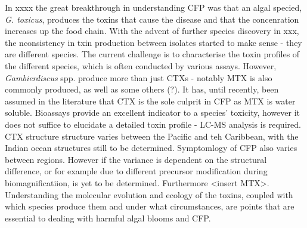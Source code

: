 \documentclass[12pt]{article}
\begin{document}
In xxxx the great breakthrough in understanding CFP was that an algal specied, \emph{G.  toxicus}, produces the toxins that cause the disease and that the concenration increases up the food chain. With the advent of further species discovery in xxx, the nconsistency in txin production between isolates started to make sense - they are different species. The current challenge is to characterise the toxin profiles of the different species, which is often conducted by various assays. However, \emph{Gambierdiscus} spp. produce more than just CTXs - notably MTX is also commonly produced, as well as some others (?). It has, until recently, been assumed in the literature that CTX is the sole culprit in CFP as MTX is water soluble. Bioassays provide an excellent indicator to a species' toxicity, however it does not suffice to elucidate a detailed toxin profile - LC-MS analysis is required. CTX structure structure varies between the Pacific and teh Caribbean, with the Indian ocean structures still to be determined. Symptomlogy of CFP also varies between regions. However if the variance is dependent on  the structural difference, or for example due to different precursor modification during biomagnificatiion, is yet to be determined. Furthermore <insert MTX>. Understanding the molecular evolution and ecology of the toxins, coupled with which species produce them and under what circumstances, are points that are essential to dealing with harmful algal blooms and CFP.  
\end{document}
